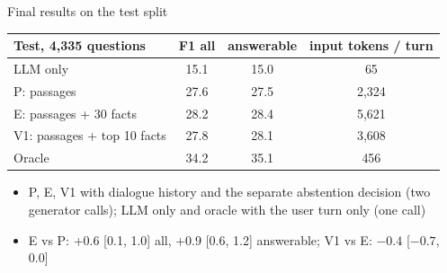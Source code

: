 \documentclass[aspectratio=169,11pt]{beamer}
\newcommand{\up}[1]{{\color{green!45!black}#1}}
\begin{document}
\begin{frame}{Final results on the test split}
\centering
\begin{tabular}{lccc}
\toprule
Test, 4,335 questions & F1 all & answerable & input tokens / turn \\
\midrule
LLM only & 15.1 & 15.0 & 65 \\ %
P: passages & 27.6 & 27.5 & 2,324 \\ %
E: passages + 30 facts & \up{28.2} & \up{28.4} & 5,621 \\ %
V1: passages + top 10 facts & 27.8 & 28.1 & 3,608 \\ %
Oracle & 34.2 & 35.1 & 456 \\ %
\bottomrule
\end{tabular}

\vspace{4mm}
\begin{itemize}
\item P, E, V1 with dialogue history and the separate abstention decision (two generator calls); LLM only and oracle with the user turn only (one call)
\item E vs P: +0.6 [0.1, 1.0] all, +0.9 [0.6, 1.2] answerable; V1 vs E: $-0.4$ [$-0.7$, 0.0] %
\end{itemize}
\end{frame}
\end{document}
